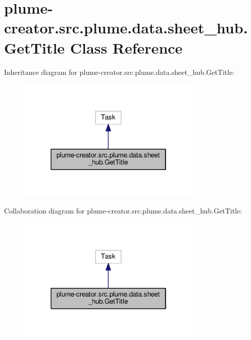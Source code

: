 \hypertarget{classplume-creator_1_1src_1_1plume_1_1data_1_1sheet__hub_1_1_get_title}{}\section{plume-\/creator.src.\+plume.\+data.\+sheet\+\_\+hub.\+Get\+Title Class Reference}
\label{classplume-creator_1_1src_1_1plume_1_1data_1_1sheet__hub_1_1_get_title}


Inheritance diagram for plume-\/creator.src.\+plume.\+data.\+sheet\+\_\+hub.\+Get\+Title\+:\nopagebreak
\begin{figure}[H]
\begin{center}
\leavevmode
\includegraphics[width=250pt]{classplume-creator_1_1src_1_1plume_1_1data_1_1sheet__hub_1_1_get_title__inherit__graph}
\end{center}
\end{figure}


Collaboration diagram for plume-\/creator.src.\+plume.\+data.\+sheet\+\_\+hub.\+Get\+Title\+:\nopagebreak
\begin{figure}[H]
\begin{center}
\leavevmode
\includegraphics[width=250pt]{classplume-creator_1_1src_1_1plume_1_1data_1_1sheet__hub_1_1_get_title__coll__graph}
\end{center}
\end{figure}
